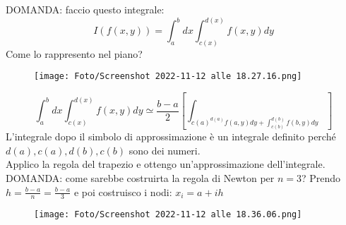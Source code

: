 \documentclass[a4paper, portrait]{book}
\numberwithin{equation}{chapter} %
\begin{document}
DOMANDA: faccio questo integrale:
\begin{equation}
    I(f(x,y)) = \int_a^b dx \int_{c(x)}^{d(x)} f(x,y) dy
\end{equation}
Come lo rappresento nel piano?
\begin{figure}[h!]
    \centering
    \texttt{[image: Foto/Screenshot 2022-11-12 alle 18.27.16.png]}
    \caption{}
\end{figure}
\begin{equation}
    \int_a^b dx \int_{c(x)}^{d(x)} f(x,y)dy \simeq \frac{b-a}{2}\left[\int_{c(a)^{d(a)}f(a,y)dy + \int_{c(b)}^{d(b)}f(b,y)dy}\right]
\end{equation}
L'integrale dopo il simbolo di approssimazione è un integrale definito perché $d(a),c(a),d(b),c(b)$ sono dei numeri.\\
Applico la regola del trapezio e ottengo un'approssimazione dell'integrale.\\
\newpage
DOMANDA: come sarebbe costruirta la regola di Newton per $n=3$?
Prendo $h = \frac{b-a}{n} = \frac{b-a}{3}$ e poi costruisco i nodi: $x_i = a+ ih$
\begin{figure}[h!]
    \centering
    \texttt{[image: Foto/Screenshot 2022-11-12 alle 18.36.06.png]}
    \caption{}
\end{figure}
\end{document}
